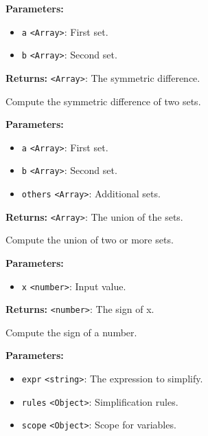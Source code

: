 \documentclass[12pt,a4paper]{article}
\begin{document}
\noindent \textbf{Parameters:}
\begin{itemize}
  \item \texttt{a} \texttt{<Array>}: First set.
  \item \texttt{b} \texttt{<Array>}: Second set.
\end{itemize}

\noindent \textbf{Returns:} \texttt{<Array>}: The symmetric difference.

\noindent Compute the symmetric difference of two sets.

\vspace{5mm}
\noindent {}


\noindent \textbf{Parameters:}
\begin{itemize}
  \item \texttt{a} \texttt{<Array>}: First set.
  \item \texttt{b} \texttt{<Array>}: Second set.
  \item \texttt{others} \texttt{<Array>}: Additional sets.
\end{itemize}

\noindent \textbf{Returns:} \texttt{<Array>}: The union of the sets.

\noindent Compute the union of two or more sets.

\vspace{5mm}
\noindent {}


\noindent \textbf{Parameters:}
\begin{itemize}
  \item \texttt{x} \texttt{<number>}: Input value.
\end{itemize}

\noindent \textbf{Returns:} \texttt{<number>}: The sign of x.

\noindent Compute the sign of a number.

\vspace{5mm}
\noindent {}


\noindent \textbf{Parameters:}
\begin{itemize}
  \item \texttt{expr} \texttt{<string>}: The expression to simplify.
  \item \texttt{rules} \texttt{<Object>}: Simplification rules.
  \item \texttt{scope} \texttt{<Object>}: Scope for variables.
\end{itemize}
\end{document}
